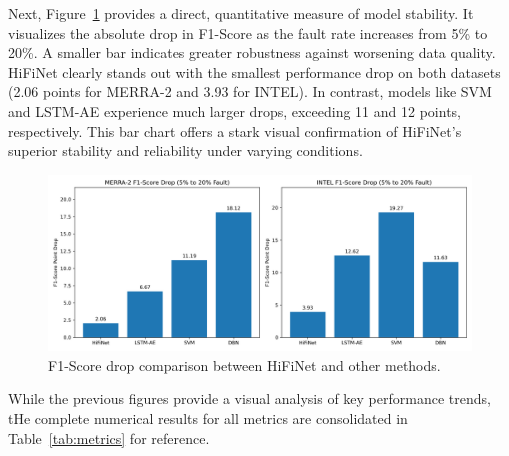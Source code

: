 Next, Figure~\ref{fig:f1_drop} provides a direct, quantitative measure of model stability. It visualizes the absolute drop in F1-Score as the fault rate increases from 5\% to 20\%. A smaller bar indicates greater robustness against worsening data quality. HiFiNet clearly stands out with the smallest performance drop on both datasets (2.06 points for MERRA-2 and 3.93 for INTEL). In contrast, models like SVM and LSTM-AE experience much larger drops, exceeding 11 and 12 points, respectively. This bar chart offers a stark visual confirmation of HiFiNet's superior stability and reliability under varying conditions.

\begin{figure}
  \centering
  \includegraphics[width=\linewidth]{images/f1_drop.png}
  \caption{F1-Score drop comparison between HiFiNet and other methods.}
  \label{fig:f1_drop}
\end{figure}

While the previous figures provide a visual analysis of key performance trends, tHe complete numerical results for all metrics are consolidated in Table~\ref{tab:metrics} for reference.

